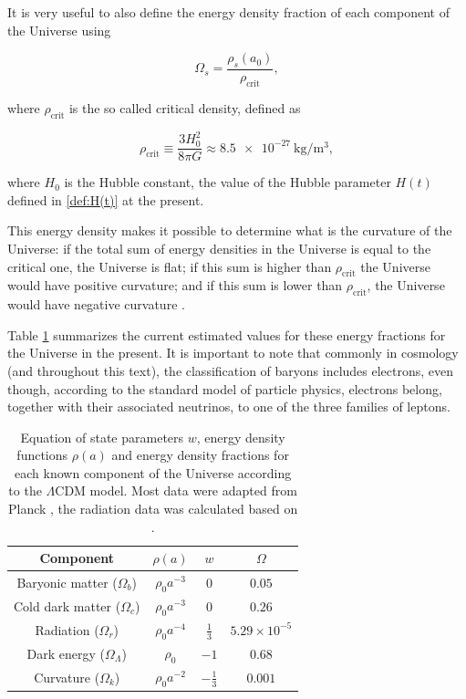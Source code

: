 \documentclass[openany,a4paper,12pt,oneside]{book}
\begin{document}
\begin{spacing}{1.5}
It is very useful to also define the energy density fraction of each component of the Universe using

\begin{equation}\label{eq:Omega_def}
    \Omega_s=\frac{\rho_s(a_0)}{\rho_\text{crit}},
\end{equation}

\noindent where $\rho_\text{crit}$ is the so called critical density, defined as

\begin{equation}\label{def:rho_crit}
    \rho_\text{crit}\equiv \frac{3H_0^2}{8\pi G}\approx \SI{8.5e-27}{\kilogram /\meter^{3}},
\end{equation}

\noindent where $H_0$ is the Hubble constant, the value of the Hubble parameter $H(t)$ defined in \eqref{def:H(t)} at the present.

This energy density makes it possible to determine what is the curvature of the Universe: if the total sum of energy densities in the Universe is equal to the critical one, the Universe is flat; if this sum is higher than $\rho_\text{crit}$ the Universe would have positive curvature; and if this sum is lower than $\rho_\text{crit}$, the Universe would have negative curvature \cite{schutz2009first}. 

Table \ref{tab:rhos&Omegas} summarizes the current estimated values for these energy fractions for the Universe in the present. It is important to note that commonly in cosmology (and throughout this text), the classification of baryons includes electrons, even though, according to the standard model of particle physics, electrons belong, together with their associated neutrinos, to one of the three families of leptons.

\begin{table}[!htb]
\centering
    \begin{tabular}{cccc} \hline
     Component & $\rho(a)$ & $w$ & $\Omega$ \\ \hline
     Baryonic matter ($\Omega_b$) & $\rho_0a^{-3}$ & $0$ & $0.05$\\
     Cold dark matter ($\Omega_c$) & $\rho_0a^{-3}$ & $0$ & $0.26$ \\
     Radiation ($\Omega_r$) & $\rho_0a^{-4}$ & $\frac{1}{3}$ & $5.29\times 10^{-5}$\\
     Dark energy ($\Omega_\Lambda$) & $\rho_0$ & $-1$ & $0.68$\\
     Curvature ($\Omega_k$) & $\rho_0 a^{-2}$ & $-\frac{1}{3}$ & $0.001$\\ \hline
    \end{tabular}
    \caption{Equation of state parameters $w$, energy density functions $\rho(a)$ and energy density fractions for each known component of the Universe according to the $\Lambda$CDM model. Most data were adapted from Planck \cite{Planck_results}, the radiation data was calculated based on \cite{lahav2014cosmological}.}
    \label{tab:rhos&Omegas}
\end{table}


\end{spacing}
\end{document}
